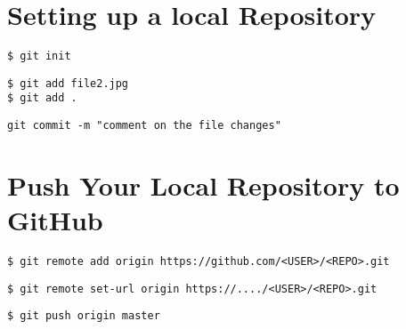 \section{Setting up a local Repository}
\begin{shaded}
\begin{verbatim}
$ git init
\end{verbatim}
\end{shaded}
\begin{shaded}
\begin{verbatim}
$ git add file2.jpg
$ git add .
\end{verbatim}
\end{shaded}
\begin{shaded}
\begin{verbatim}
git commit -m "comment on the file changes"
\end{verbatim}
\end{shaded}

\newpage

\section{Push Your Local Repository to GitHub}

\begin{shaded}
\begin{verbatim}
$ git remote add origin https://github.com/<USER>/<REPO>.git
\end{verbatim}
\end{shaded}

\begin{shaded}
\begin{verbatim}
$ git remote set-url origin https://..../<USER>/<REPO>.git
\end{verbatim}
\end{shaded}
\begin{shaded}
\begin{verbatim}
$ git push origin master
\end{verbatim}
\end{shaded}

